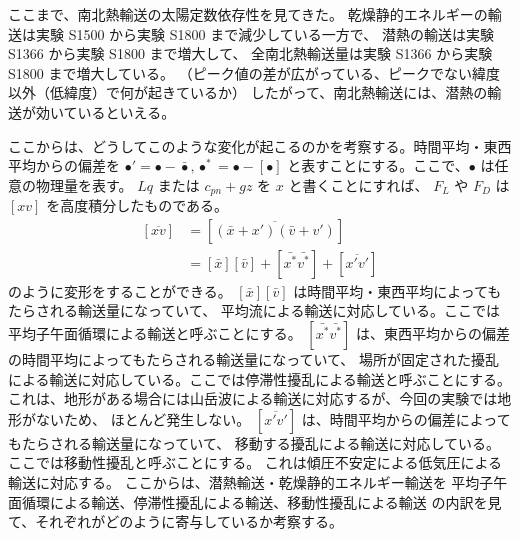 \documentclass[body]{subfiles}
\begin{document}
ここまで、南北熱輸送の太陽定数依存性を見てきた。
乾燥静的エネルギーの輸送は実験 S1500 から実験 S1800 まで減少している一方で、
潜熱の輸送は実験 S1366 から実験 S1800 まで増大して、
全南北熱輸送量は実験 S1366 から実験 S1800 まで増大している。
（ピーク値の差が広がっている、ピークでない緯度以外（低緯度）で何が起きているか）
したがって、南北熱輸送には、潜熱の輸送が効いているといえる。

\afterpage{\clearpage}

ここからは、どうしてこのような変化が起こるのかを考察する。時間平均・東西平均からの偏差を
\(\bullet'=\bullet-\bar\bullet, \bullet^*=\bullet-[\bullet]\)
と表すことにする。ここで、\(\bullet\) は任意の物理量を表す。
\(Lq\) または \(c_{pn}+gz\) を \(x\) と書くことにすれば、
\(F_L\) や \(F_D\) は \([xv]\) を高度積分したものである。
\begin{equation}
	\begin{split}
		[\overline{xv}]&=[\overline{(\bar x+x')(\bar v+v')}]\\
		&=[\bar x][\bar v]+[\bar{x^*}\bar{v^*}]+[\overline{x'v'}]
	\end{split}\label{keith5}
\end{equation}
のように変形をすることができる。
\([\bar x][\bar v]\) は時間平均・東西平均によってもたらされる輸送量になっていて、
平均流による輸送に対応している。ここでは平均子午面循環による輸送と呼ぶことにする。
\([\bar{x^*}\bar{v^*}]\) は、東西平均からの偏差の時間平均によってもたらされる輸送量になっていて、
場所が固定された擾乱による輸送に対応している。ここでは停滞性擾乱による輸送と呼ぶことにする。
これは、地形がある場合には山岳波による輸送に対応するが、今回の実験では地形がないため、
ほとんど発生しない。
\([\overline{x'v'}]\) は、時間平均からの偏差によってもたらされる輸送量になっていて、
移動する擾乱による輸送に対応している。ここでは移動性擾乱と呼ぶことにする。
これは傾圧不安定による低気圧による輸送に対応する。
ここからは、潜熱輸送・乾燥静的エネルギー輸送を
平均子午面循環による輸送、停滞性擾乱による輸送、移動性擾乱による輸送
の内訳を見て、それぞれがどのように寄与しているか考察する。
\end{document}
